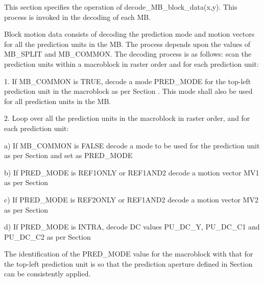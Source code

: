 This section specifies the operation of decode\_MB\_block\_data(x,y). This
process is invoked in the decoding of each MB.

Block motion data consists of decoding the prediction mode and motion
vectors for all the prediction units in the MB. The process depends upon
the values of MB\_SPLIT and MB\_COMMON. The decoding process is as
follows: scan the prediction units within a macroblock in raster order
and for each prediction unit:

1. If MB\_COMMON is TRUE, decode a mode PRED\_MODE for the top-left
prediction unit in the macroblock as per Section . This mode shall also
be used for all prediction units in the MB. 

2. Loop over all the prediction units in the macroblock in raster order,
and for each prediction unit:

a) If MB\_COMMON is FALSE decode a mode to be used for the prediction
unit as per Section  and set as PRED\_MODE

b) If  PRED\_MODE is REF1ONLY or REF1AND2 decode a motion vector MV1 as
per Section 

c) If  PRED\_MODE is REF2ONLY or REF1AND2 decode a motion vector MV2 as
per Section 

d) If PRED\_MODE is INTRA, decode DC values PU\_DC\_Y, PU\_DC\_C1 and
PU\_DC\_C2 as per Section 



\begin{informative}
The identification of the PRED\_MODE value for the macroblock with that
for the top-left prediction unit is so that the prediction aperture
defined in Section  can be consistently applied.
\end{informative}

